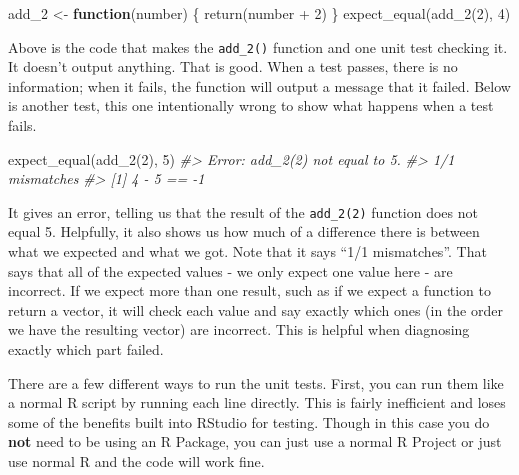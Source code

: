 \documentclass[
]{krantz}
\makeatletter
\newenvironment{Shaded}{\begin{snugshade}}{\end{snugshade}}
\newcommand{\CommentTok}[1]{\textcolor[rgb]{0.37,0.37,0.37}{\textit{#1}}}
\newcommand{\ControlFlowTok}[1]{\textcolor[rgb]{0.27,0.27,0.27}{\textbf{#1}}}
\newcommand{\DecValTok}[1]{\textcolor[rgb]{0.06,0.06,0.06}{#1}}
\newcommand{\FunctionTok}[1]{\textcolor[rgb]{0,0,0}{#1}}
\newcommand{\NormalTok}[1]{#1}
\newcommand{\OtherTok}[1]{\textcolor[rgb]{0.37,0.37,0.37}{#1}}
\newcommand{\SpecialCharTok}[1]{\textcolor[rgb]{0,0,0}{#1}}
\newenvironment{kframe}{%
\medskip{}
\setlength{\fboxsep}{.8em}
 \def\at@end@of@kframe{}%
 \ifinner\ifhmode%
  \def\at@end@of@kframe{\end{minipage}}%
  \begin{minipage}{\columnwidth}%
 \fi\fi%
 \def\FrameCommand##1{\hskip\@totalleftmargin \hskip-\fboxsep
 \colorbox{shadecolor}{##1}\hskip-\fboxsep
     \hskip-\linewidth \hskip-\@totalleftmargin \hskip\columnwidth}%
 \MakeFramed {\advance\hsize-\width
   \@totalleftmargin\z@ \linewidth\hsize
   \@setminipage}}%
 {\par\unskip\endMakeFramed%
 \at@end@of@kframe}
\renewenvironment{Shaded}{\begin{kframe}}{\end{kframe}}
\makeatother
\begin{document}
\begin{Shaded}
\begin{Highlighting}[]
\NormalTok{add\_2 }\OtherTok{\textless{}{-}} \ControlFlowTok{function}\NormalTok{(number) \{}
  \FunctionTok{return}\NormalTok{(number }\SpecialCharTok{+} \DecValTok{2}\NormalTok{)}
\NormalTok{\}}
\FunctionTok{expect\_equal}\NormalTok{(}\FunctionTok{add\_2}\NormalTok{(}\DecValTok{2}\NormalTok{), }\DecValTok{4}\NormalTok{)}
\end{Highlighting}
\end{Shaded}

Above is the code that makes the \texttt{add\_2()} function
and one unit test checking it. It doesn't output anything.
That is good. When a test passes, there is no information;
when it fails, the function will output a message that it
failed. Below is another test, this one intentionally wrong
to show what happens when a test fails.

\begin{Shaded}
\begin{Highlighting}[]
\FunctionTok{expect\_equal}\NormalTok{(}\FunctionTok{add\_2}\NormalTok{(}\DecValTok{2}\NormalTok{), }\DecValTok{5}\NormalTok{)}
\CommentTok{\#\textgreater{} Error: add\_2(2) not equal to 5.}
\CommentTok{\#\textgreater{} 1/1 mismatches}
\CommentTok{\#\textgreater{} [1] 4 {-} 5 == {-}1}
\end{Highlighting}
\end{Shaded}

It gives an error, telling us that the result of the
\texttt{add\_2(2)} function does not equal 5. Helpfully, it
also shows us how much of a difference there is between what
we expected and what we got. Note that it says ``1/1
mismatches''. That says that all of the expected values - we
only expect one value here - are incorrect. If we expect
more than one result, such as if we expect a function to
return a vector, it will check each value and say exactly
which ones (in the order we have the resulting vector) are
incorrect. This is helpful when diagnosing exactly which
part failed.

There are a few different ways to run the unit tests. First,
you can run them like a normal R script by running each line
directly. This is fairly inefficient and loses some of the
benefits built into RStudio for testing. Though in this case
you do \textbf{not} need to be using an R Package, you can
just use a normal R Project or just use normal R and the
code will work fine.
\end{document}
